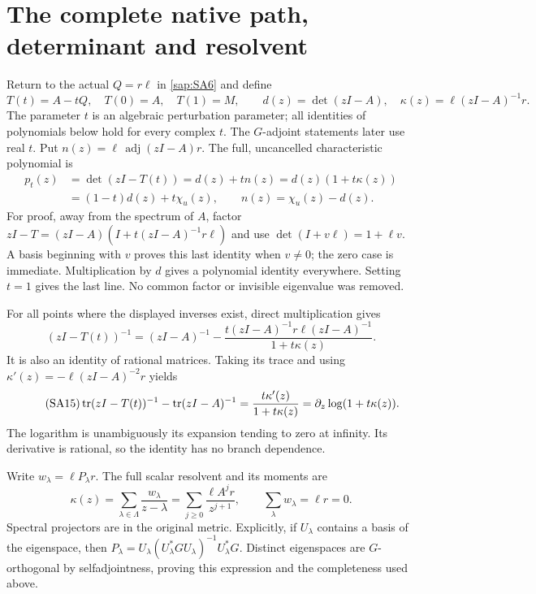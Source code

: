 \section{The complete native path, determinant and resolvent}

Return to the actual $Q=r\ell$ in \eqref{sap:SA6} and define
\begin{equation}\tag{SA12}\label{sap:SA12}
T(t)=A-tQ,\quad T(0)=A,\quad T(1)=M,\qquad
d(z)=\det(zI-A),\quad
\kappa(z)=\ell(zI-A)^{-1}r.
\end{equation}
The parameter $t$ is an algebraic perturbation parameter;
all identities of polynomials below hold for every complex
$t$. The $G$-adjoint statements later use real $t$.
Put $n(z)=\ell\,\operatorname{adj}(zI-A)r$.
The full, uncancelled characteristic polynomial is
\begin{equation}\tag{SA13}\label{sap:SA13}
\begin{split}
p_t(z)&=\det(zI-T(t))=d(z)+t n(z)
       =d(z)(1+t\kappa(z))\\
      &=(1-t)d(z)+t\chi_u(z),\qquad
n(z)=\chi_u(z)-d(z).
\end{split}
\end{equation}
For proof, away from the spectrum of $A$, factor
$zI-T=(zI-A)(I+t(zI-A)^{-1}r\ell)$ and use
$\det(I+v\ell)=1+\ell v$. A basis beginning with $v$
proves this last identity when $v\ne0$; the zero case is
immediate. Multiplication by $d$ gives a polynomial
identity everywhere. Setting $t=1$ gives the last line.
No common factor or invisible eigenvalue was removed.

For all points where the displayed inverses exist, direct
multiplication gives
\begin{equation}\tag{SA14}\label{sap:SA14}
(zI-T(t))^{-1}
=(zI-A)^{-1}
-\frac{t(zI-A)^{-1}r\ell(zI-A)^{-1}}
       {1+t\kappa(z)}.
\end{equation}
It is also an identity of rational matrices.
Taking its trace and using
$\kappa'(z)=-\ell(zI-A)^{-2}r$ yields
\begin{equation}\tag{SA15}\label{sap:SA15}
\operatorname{tr}(zI-T(t))^{-1}-\operatorname{tr}(zI-A)^{-1}
=\frac{t\kappa'(z)}{1+t\kappa(z)}
=\partial_z\log(1+t\kappa(z)).
\end{equation}
The logarithm is unambiguously its expansion tending to
zero at infinity. Its derivative is rational, so the
identity has no branch dependence.

Write $w_\lambda=\ell P_\lambda r$. The full scalar
resolvent and its moments are
\begin{equation}\tag{SA16}\label{sap:SA16}
\kappa(z)=\sum_{\lambda\in\Lambda}
\frac{w_\lambda}{z-\lambda}
=\sum_{j\geq0}\frac{\ell A^jr}{z^{j+1}},
\qquad \sum_\lambda w_\lambda=\ell r=0.
\end{equation}
Spectral projectors are in the original metric. Explicitly,
if $U_\lambda$ contains a basis of the eigenspace, then
$P_\lambda=U_\lambda(U_\lambda^*GU_\lambda)^{-1}
U_\lambda^*G$. Distinct eigenspaces are $G$-orthogonal
by selfadjointness, proving this expression and the
completeness used above.

